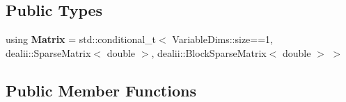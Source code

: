 \subsection*{Public Types}
\begin{DoxyCompactItemize}
\item 
\hypertarget{classSpacy_1_1dealII_1_1LinearOperator_ab5de1acdaee1f8ec8e80902c130e0973}{using {\bfseries Matrix} = std\-::conditional\-\_\-t$<$ Variable\-Dims\-::size==1, dealii\-::\-Sparse\-Matrix$<$ double $>$, dealii\-::\-Block\-Sparse\-Matrix$<$ double $>$ $>$}\label{classSpacy_1_1dealII_1_1LinearOperator_ab5de1acdaee1f8ec8e80902c130e0973}

\end{DoxyCompactItemize}
\subsection*{Public Member Functions}

